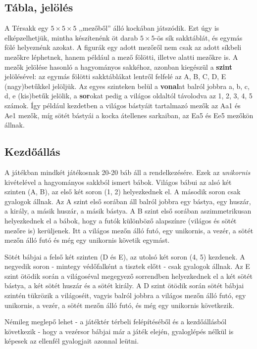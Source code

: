 \documentclass[12pt, twoside]{report}
\begin{document}
\subsection{Tábla, jelölés}

A Térsakk egy $ 5 \times 5 \times 5 $ ,,mezőből'' álló kockában játszódik. Ezt úgy is elképzelhetjük, mintha készítenénk öt darab $ 5 \times 5 $-ös sík sakktáblát, és egymás fölé helyeznénk azokat. A figurák egy adott mezőről nem csak az adott síkbeli mezőkre léphetnek, hanem például a mező fölötti, illetve alatti mezőkre is. A mezők jelölése hasonló a hagyományos sakkéhoz, azonban kiegészül a \textbf{szint} jelölésével: az egymás fölötti sakktáblákat lentről felfelé az A, B, C, D, E (nagy)betűkkel jelöljük. Az egyes szinteken belül a \textbf{vonal}at balról jobbra a, b, c, d, e (kis)betűk jelölik, a \textbf{sor}okat pedig a világos oldaltól távolodva az 1, 2, 3, 4, 5 számok. Így például kezdetben a világos bástyáit tartalmazó mezők az Aa1 és Ae1 mezők, míg sötét bástyái a kocka átellenes sarkaiban, az Ea5 és Ee5 mezőkön állnak.

\subsection{Kezdőállás}
A játékban mindkét játékosnak 20-20 báb áll a rendelkezésére. Ezek az \textit{unikornis} kivételével a hagyományos sakkból ismert bábok. Világos bábui az alsó két szinten (A, B), az első két soron (1, 2) helyezkednek el. A második soron csak gyalogok állnak. Az A szint első sorában áll balról jobbra egy bástya, egy huszár, a király, a másik huszár, a másik bástya. A B szint első sorában aszimmetrikusan helyezkednek el a bábok, hogy a futók különböző alapszínre (világos és sötét mezőre is) kerüljenek. Itt a világos mezőn álló futó, egy unikornis, a vezér, a sötét mezőn álló futó és még egy unikornis követik egymást.

Sötét bábjai a felső két szinten (D és E), az utolsó két soron (4, 5) kezdenek. A negyedik soron - mintegy védőfalként a tisztek előtt - csak gyalogok állnak. Az E szint ötödik során a világoséval megegyező sorrendben helyezkednek el a két sötét bástya, a két sötét huszár és a sötét király. A D szint ötödik során sötét bábjai szintén tükrözik a világoséit, vagyis balról jobbra a világos mezőn álló futó, egy unikornis, a vezér, a sötét mezőn álló futó, és még egy unikornis következik.

Némileg meglepő lehet - a játéktér térbeli felépítéséből és a kezdőállásból következik - hogy a vezérsor bábjai már a játék elején, gyaloglépés nélkül is képesek az ellenfél gyalogjait azonnal leütni.
\end{document}
